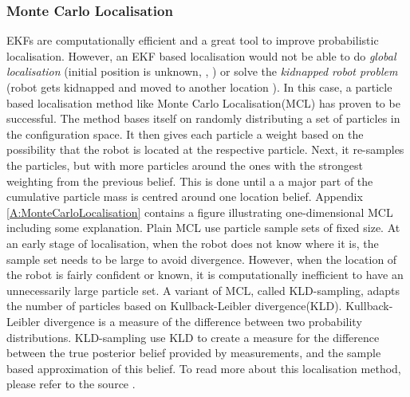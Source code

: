 \subsubsection{Monte Carlo Localisation}
EKFs are computationally efficient and a great tool to improve probabilistic localisation. However, an EKF based localisation would not be able to do \textit{global localisation} (initial position is unknown, \cite{SiegwartRoland2011Itam}, \cite{ThrunSebastian2005Pr}) or solve the \textit{kidnapped robot problem} (robot gets kidnapped and moved to another location \cite{SiegwartRoland2011Itam} \cite{ThrunSebastian2005Pr}). In this case, a particle based localisation method like Monte Carlo Localisation(MCL) has proven to be successful. The method bases itself on randomly distributing a set of particles in the configuration space. It then gives each particle a weight based on the possibility that the robot is located at the respective particle. Next, it re-samples the particles, but with more particles around the ones with the strongest weighting from the previous belief. This is done until a a major part of the cumulative particle mass is centred around one location belief. Appendix \ref{A:MonteCarloLocalisation} contains a figure illustrating one-dimensional MCL including some explanation.
Plain MCL use particle sample sets of fixed size. At an early stage of localisation, when the robot does not know where it is, the sample set needs to be large to avoid divergence. However, when the location of the robot is fairly confident or known, it is computationally inefficient to have an unnecessarily large particle set. A variant of MCL, called KLD-sampling, adapts the number of particles based on Kullback-Leibler divergence(KLD). Kullback-Leibler divergence is a measure of the difference between two probability distributions. KLD-sampling use KLD to create a measure for the difference between the true posterior belief provided by measurements, and the sample based approximation of this belief. To read more about this localisation method, please refer to the source \cite{ThrunSebastian2005Pr}.

